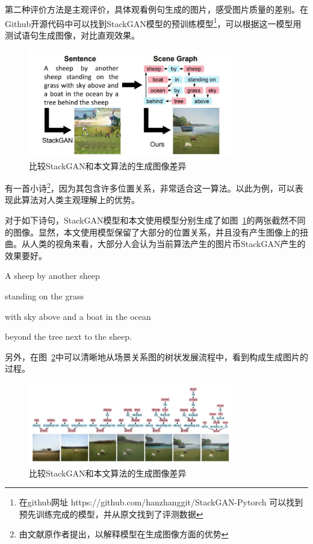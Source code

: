 第二种评价方法是主观评价，具体观看例句生成的图片，感受图片质量的差别。在Github开源代码中可以找到StackGAN模型的预训练模型\footnote{在github网址 https://github.com/hanzhanggit/StackGAN-Pytorch 可以找到预先训练完成的模型，并从原文找到了评测数据}，可以根据这一模型用测试语句生成图像，对比直观效果。

\begin{figure}[!htb]
    \centering
    \includegraphics[width=0.8\textwidth]{figures/sg2imcp.png}
    \caption{比较StackGAN和本文算法的生成图像差异}
    \label{fig:sg2imcp}
\end{figure}

有一首小诗\footnote{由文献\cite{Johnson_2018}原作者提出，以解释模型在生成图像方面的优势}，因为其包含许多位置关系，非常适合这一算法。以此为例，可以表现此算法对人类主观理解上的优势。

对于如下诗句，StackGAN模型和本文使用模型分别生成了如图~\ref{fig:sg2imcp}的两张截然不同的图像。显然，本文使用模型保留了大部分的位置关系，并且没有产生图像上的扭曲。从人类的视角来看，大部分人会认为当前算法产生的图片币StackGAN产生的效果要好。

A sheep by another sheep

standing on the grass

with sky above and a boat in the ocean

beyond the tree next to the sheep.

另外，在图~\ref{fig:sg2imeg}中可以清晰地从场景关系图的树状发展流程中，看到构成生成图片的过程。

\begin{figure}[!htbp]
    \centering
    \includegraphics[width=0.8\textwidth]{figures/sg2imeg.png}
    \caption{比较StackGAN和本文算法的生成图像差异}
    \label{fig:sg2imeg}
\end{figure}

